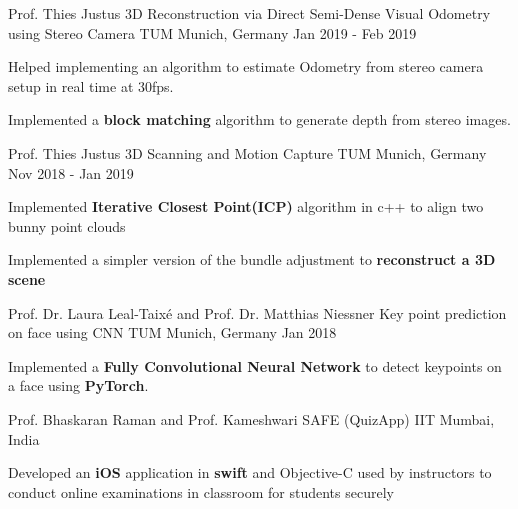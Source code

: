 \begin{cventries}
  	\cventry
    {Prof. Thies Justus} %
    {3D Reconstruction via Direct Semi-Dense Visual Odometry using Stereo Camera} %
    {TUM Munich, Germany} %
    {Jan 2019 - Feb 2019} %
    {
      \begin{cvitems} %
      	\item {Helped implementing an algorithm to estimate Odometry from stereo camera setup in real time at 30fps.}
		\item {Implemented a \textbf{block matching} algorithm to generate depth from stereo images.}
      \end{cvitems}
	}
	
	\cventry
	{Prof. Thies Justus} %
	{3D Scanning and Motion Capture} %
	{TUM Munich, Germany} %
	{Nov 2018 - Jan 2019} %
	{
		\begin{cvitems} %
			\item {Implemented \textbf{Iterative Closest Point(ICP)} algorithm in c++ to align two bunny point clouds}
			\item {Implemented a simpler version of the bundle adjustment to \textbf{reconstruct a 3D scene}}
		\end{cvitems}
	}

	\cventry
	{Prof. Dr. Laura Leal-Taixé and Prof. Dr. Matthias Niessner} %
	{Key point prediction on face using CNN} %
	{TUM Munich, Germany} %
	{Jan 2018} %
	{
		\begin{cvitems} %
			\item {Implemented a \textbf{Fully Convolutional Neural Network} to detect keypoints on a face using \textbf{PyTorch}.}
		\end{cvitems}
	}

	\cventry
	{Prof. Bhaskaran Raman and Prof. Kameshwari} %
	{SAFE (QuizApp)} %
	{IIT Mumbai, India} %
	{} %
	{
		\begin{cvitems} %
			\item {Developed an \textbf{iOS} application in \textbf{swift} and Objective-C used by
			instructors to conduct online examinations in classroom for students
			securely}
		\end{cvitems}
	}

\end{cventries}
